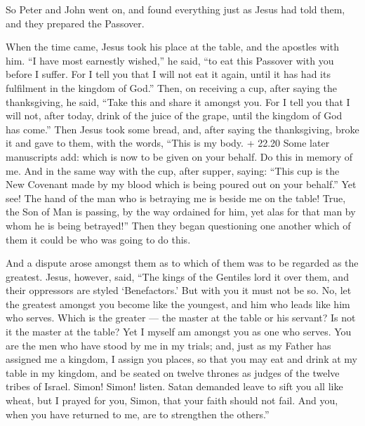  So Peter and John went on, and found everything just as
Jesus had told them, and they prepared the Passover.

 When the time came, Jesus took his place at the table, and
the apostles with him.  ``I have most earnestly wished,''
he said, ``to eat this Passover with you before I suffer. 
For I tell you that I will not eat it again, until it has had its
fulfilment in the kingdom of God.''  Then, on receiving a
cup, after saying the thanksgiving, he said, ``Take this and share it
amongst you.  For I tell you that I will not, after today,
drink of the juice of the grape, until the kingdom of God has come.''
 Then Jesus took some bread, and, after saying the
thanksgiving, broke it and gave to them, with the words, ``This is my
body.  + 22.20 Some later manuscripts add: which is now to
be given on your behalf. Do this in memory of me. And in the same way
with the cup, after supper, saying: ``This cup is the New Covenant made
by my blood which is being poured out on your behalf.'' 
Yet see! The hand of the man who is betraying me is beside me on the
table!  True, the Son of Man is passing, by the way
ordained for him, yet alas for that man by whom he is being betrayed!''
 Then they began questioning one another which of them it
could be who was going to do this.

 And a dispute arose amongst them as to which of them was
to be regarded as the greatest.  Jesus, however, said,
``The kings of the Gentiles lord it over them, and their oppressors are
styled `Benefactors.'  But with you it must not be so. No,
let the greatest amongst you become like the youngest, and him who leads
like him who serves.  Which is the greater --- the master
at the table or his servant? Is not it the master at the table? Yet I
myself am amongst you as one who serves.  You are the men
who have stood by me in my trials;  and, just as my Father
has assigned me a kingdom, I assign you places,  so that
you may eat and drink at my table in my kingdom, and be seated on twelve
thrones as judges of the twelve tribes of Israel.  Simon!
Simon! listen. Satan demanded leave to sift you all like wheat,
 but I prayed for you, Simon, that your faith should not
fail. And you, when you have returned to me, are to strengthen the
others.''

